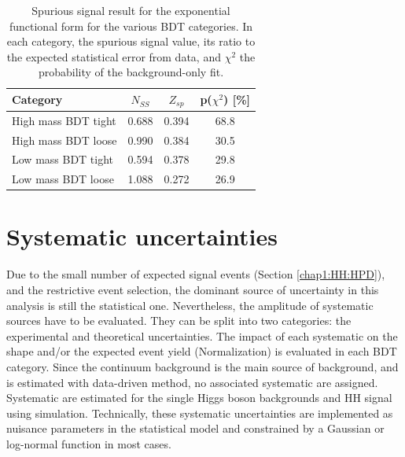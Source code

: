 \begin{table}[]
    \centering
    \begin{tabular}{lccc}
    \hline\hline
       Category  & $N_{SS}$ & $Z_{sp}$ & p($\chi^2$) [\%] \\
       \hline
       High mass BDT tight &  0.688 & 0.394 & 68.8 \\
       High mass BDT loose &  0.990 & 0.384 & 30.5 \\
       Low mass BDT tight  &  0.594 & 0.378 & 29.8 \\
       Low mass BDT loose  & 1.088  & 0.272 & 26.9 \\
       \hline\hline
    \end{tabular}
    \caption{Spurious signal result for the exponential functional form for the various BDT categories. In each category, the spurious signal value, its ratio to the expected statistical error from data, and $\chi^2$ the probability of the background-only fit.}
    \label{tab:HHyybb:Modelling:Bkg:SS}
\end{table}

\section{Systematic uncertainties}
\label{HHyybb:Syst}
Due to the small number of expected signal events (Section \ref{chap1:HH:HPD}), and the restrictive event selection, the dominant source of uncertainty in this analysis is still the statistical one. Nevertheless, the amplitude of systematic sources have to be evaluated. They can be split into two categories: the experimental and theoretical uncertainties. The impact of each systematic on the shape and/or the expected event yield (Normalization) is evaluated in each BDT category. Since the continuum background is the main source of background, and is estimated with data-driven method, no associated systematic are assigned. Systematic are estimated for the single Higgs boson backgrounds and HH signal using simulation. Technically, these systematic uncertainties are implemented as nuisance parameters in the statistical model and constrained by a Gaussian or log-normal function in most cases. 
